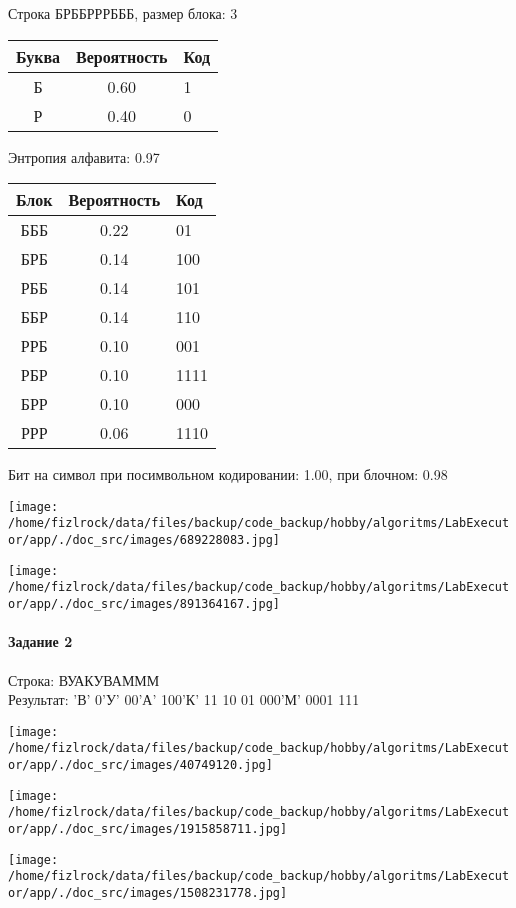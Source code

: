 \documentclass[a4paper, 12pt]{article}
\begin{document}
Строка БРББРРРБББ, размер блока: 3
\begin{center}
 \begin{tabular}{ |c|c|l| } 
  \hline
     Буква & Вероятность & Код\\ \hline
Б & 0.60 & 1\\\hline
Р & 0.40 & 0
\\ \hline \end{tabular}
\end{center}
Энтропия алфавита: 0.97
\begin{center}
 \begin{tabular}{ |c|c|l| } 
  \hline
     Блок & Вероятность & Код\\ \hline
БББ & 0.22 & 01\\\hline
БРБ & 0.14 & 100\\\hline
РББ & 0.14 & 101\\\hline
ББР & 0.14 & 110\\\hline
РРБ & 0.10 & 001\\\hline
РБР & 0.10 & 1111\\\hline
БРР & 0.10 & 000\\\hline
РРР & 0.06 & 1110
\\ \hline \end{tabular}
\end{center}
Бит на символ при посимвольном кодировании: 1.00, при блочном: 0.98

\texttt{[image: /home/fizlrock/data/files/backup/code\_backup/hobby/algoritms/LabExecutor/app/./doc\_src/images/689228083.jpg]}

\texttt{[image: /home/fizlrock/data/files/backup/code\_backup/hobby/algoritms/LabExecutor/app/./doc\_src/images/891364167.jpg]}
\pagebreak
\paragraph{Задание 2}

Строка: 
ВУАКУВАМММ\\
Результат: 'В' 0'У' 00'А' 100'К' 11 10 01 000'М' 0001 111

\texttt{[image: /home/fizlrock/data/files/backup/code\_backup/hobby/algoritms/LabExecutor/app/./doc\_src/images/40749120.jpg]}

\texttt{[image: /home/fizlrock/data/files/backup/code\_backup/hobby/algoritms/LabExecutor/app/./doc\_src/images/1915858711.jpg]}

\texttt{[image: /home/fizlrock/data/files/backup/code\_backup/hobby/algoritms/LabExecutor/app/./doc\_src/images/1508231778.jpg]}
\end{document}
